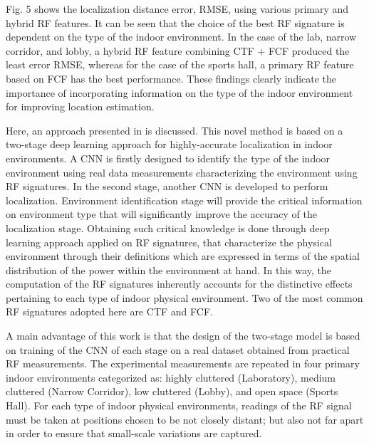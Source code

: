 \begin{enumerate}
            Fig. 5 shows the localization distance error, RMSE, using various primary and hybrid RF features. It can be seen that the choice of the best RF signature is dependent on the type of the indoor environment. In the case of the lab, narrow corridor, and lobby, a hybrid RF feature combining CTF + FCF produced the least error RMSE, whereas for the case of the sports hall, a primary RF feature based on FCF has the best performance. These findings clearly indicate the importance of incorporating information on the type of the indoor environment for improving    location estimation.
        \end{enumerate}
    
    Here, an approach presented in \cite{dl} is discussed. This novel method is based on a two-stage deep learning approach for highly-accurate localization in indoor environments. A CNN is firstly designed to identify the type of the indoor environment using real data measurements characterizing the environment using RF signatures. In the second stage, another CNN is developed to perform localization. Environment identification stage will provide the critical information on environment type that will significantly improve the accuracy of the localization stage. Obtaining such critical knowledge is done through deep learning approach applied on RF signatures, that characterize the physical environment through their definitions which are expressed in terms of the spatial distribution of the power within the environment at hand. In this way, the computation of the RF signatures inherently accounts for the distinctive effects pertaining to each type of indoor physical environment. Two of the most common RF signatures adopted here are CTF and FCF.

    A main advantage of this work is that the design of the two-stage model is based on training of the CNN of each stage on a real dataset obtained from practical RF measurements. The experimental measurements are repeated in four primary indoor environments categorized as: highly cluttered (Laboratory), medium cluttered (Narrow Corridor), low cluttered (Lobby), and open space (Sports Hall). For each type of indoor physical environments, readings of the RF signal must be taken at positions chosen to be not closely distant; but also not far apart in order to ensure that small-scale variations are captured.
    
